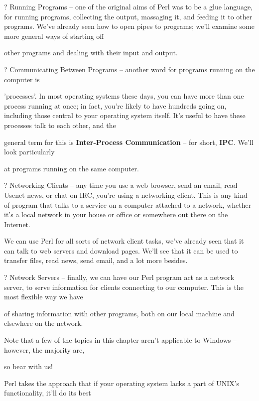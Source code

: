 \documentclass[a4paper,11pt]{book}
\begin{document}
\noindent 

\noindent ? Running Programs -- one of the original aims of Perl was to be a glue language, for running programs, collecting the output, massaging it, and feeding it to other programs. We've already seen how to open pipes to programs; we'll examine some more general ways of starting off

\noindent other programs and dealing with their input and output.

\noindent ? Communicating Between Programs -- another word for programs running on the computer is

\noindent 'processes'. In most operating systems these days, you can have more than one process running at once; in fact, you're likely to have hundreds going on, including those central to your operating system itself. It's useful to have these processes talk to each other, and the

\noindent general term for this is \textbf{Inter-Process Communication }-- for short, \textbf{IPC}. We'll look particularly

\noindent at programs running on the same computer.

\noindent ? Networking Clients -- any time you use a web browser, send an email, read Usenet news, or chat on IRC, you're using a networking client. This is any kind of program that talks to a service on a computer attached to a network, whether it's a local network in your house or office or somewhere out there on the Internet.

\noindent We can use Perl for all sorts of network client tasks, we've already seen that it can talk to web servers and download pages. We'll see that it can be used to transfer files, read news, send email, and a lot more besides.

\noindent ? Network Servers -- finally, we can have our Perl program act as a network server, to serve information for clients connecting to our computer. This is the most flexible way we have

\noindent of sharing information with other programs, both on our local machine and elsewhere on the network.

\noindent 

\noindent Note that a few of the topics in this chapter aren't applicable to Windows -- however, the majority are,

\noindent so bear with us!

\noindent 

\noindent Perl takes the approach that if your operating system lacks a part of UNIX's functionality, it'll do its best
\end{document}
